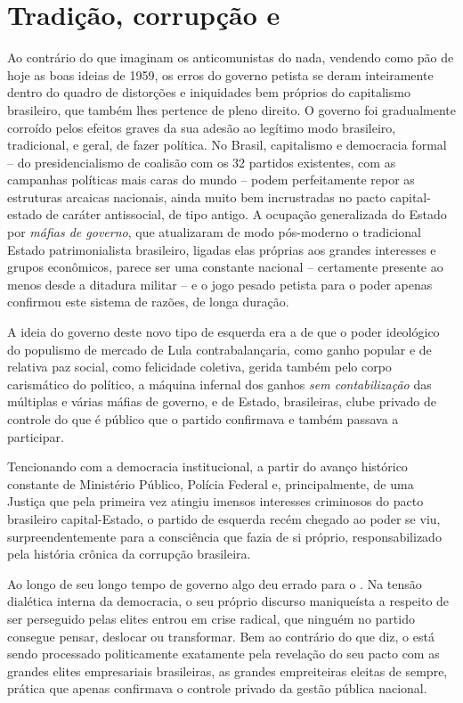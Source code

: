   \section{Tradição, corrupção e
  }\label{tradiuxe7uxe3o-corrupuxe7uxe3o-e-pt}

Ao contrário do que imaginam os anticomunistas do nada, vendendo como
pão de hoje as boas ideias de 1959, os erros do governo petista se deram
inteiramente dentro do quadro de distorções e iniquidades bem próprios
do capitalismo brasileiro, que também lhes pertence de pleno direito. O
governo foi gradualmente corroído pelos efeitos graves da sua adesão ao
legítimo modo brasileiro, tradicional, e geral, de fazer política. No
Brasil, capitalismo e democracia formal -- do presidencialismo de
coalisão com os 32 partidos existentes, com as campanhas políticas mais
caras do mundo -- podem perfeitamente repor as estruturas arcaicas
nacionais, ainda muito bem incrustradas no pacto capital-estado de
caráter antissocial, de tipo antigo. A ocupação generalizada do Estado
por \emph{máfias de governo}, que atualizaram de modo pós-moderno o
tradicional Estado patrimonialista brasileiro, ligadas elas próprias aos
grandes interesses e grupos econômicos, parece ser uma constante
nacional -- certamente presente ao menos desde a ditadura militar -- e o
jogo pesado petista para o poder apenas confirmou este sistema de
razões, de longa duração.

A ideia do governo deste novo tipo de esquerda era a de que o poder
ideológico do populismo de mercado de Lula contrabalançaria, como ganho
popular e de relativa paz social, como felicidade coletiva, gerida
também pelo corpo carismático do político, a máquina infernal dos ganhos
\emph{sem contabilização} das múltiplas e várias máfias de governo, e de
Estado, brasileiras, clube privado de controle do que é público que o
partido confirmava e também passava a participar.

Tencionando com a democracia institucional, a partir do avanço histórico
constante de Ministério Público, Polícia Federal e, principalmente, de
uma Justiça que pela primeira vez atingiu imensos interesses criminosos
do pacto brasileiro capital-Estado, o partido de esquerda recém chegado
ao poder se viu, surpreendentemente para a consciência que fazia de si
próprio, responsabilizado pela história crônica da corrupção brasileira.

Ao longo de seu longo tempo de governo algo deu errado para o . Na
tensão dialética interna da democracia, o seu próprio discurso
maniqueísta a respeito de ser perseguido pelas elites entrou em crise
radical, que ninguém no partido consegue pensar, deslocar ou
transformar. Bem ao contrário do que diz, o  está sendo processado
politicamente exatamente pela revelação do seu pacto com as grandes
elites empresariais brasileiras, as grandes empreiteiras eleitas de
sempre, prática que apenas confirmava o controle privado da gestão
pública nacional.

